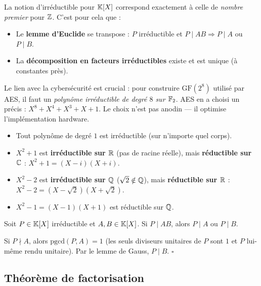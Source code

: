 \begin{intuitionbox}
La notion d'irréductible pour $\mathbb{K}[X]$ correspond exactement à celle de \emph{nombre premier} pour $\mathbb{Z}$. C'est pour cela que :
\begin{itemize}[leftmargin=1cm]
  \item Le \textbf{lemme d'Euclide} se transpose : $P$ irréductible et $P \mid AB \Rightarrow P \mid A$ ou $P \mid B$.
  \item La \textbf{décomposition en facteurs irréductibles} existe et est unique (à constantes près).
\end{itemize}
Le lien avec la cybersécurité est crucial : pour construire $\mathrm{GF}(2^8)$ utilisé par AES, il faut un \emph{polynôme irréductible de degré $8$ sur $\mathbb{F}_2$}. AES en a choisi un précis : $X^8 + X^4 + X^3 + X + 1$. Le choix n'est pas anodin --- il optimise l'implémentation hardware.
\end{intuitionbox}

\begin{exbox}
\begin{itemize}[leftmargin=1cm]
  \item Tout polynôme de degré $1$ est irréductible (sur n'importe quel corps).
  \item $X^2 + 1$ est \textbf{irréductible sur $\mathbb{R}$} (pas de racine réelle), mais \textbf{réductible sur $\mathbb{C}$} : $X^2 + 1 = (X - i)(X + i)$.
  \item $X^2 - 2$ est \textbf{irréductible sur $\mathbb{Q}$} ($\sqrt{2} \notin \mathbb{Q}$), mais \textbf{réductible sur $\mathbb{R}$} : $X^2 - 2 = (X - \sqrt{2})(X + \sqrt{2})$.
  \item $X^2 - 1 = (X - 1)(X + 1)$ est réductible sur $\mathbb{Q}$.
\end{itemize}
\end{exbox}

\begin{propbox}
Soit $P \in \mathbb{K}[X]$ irréductible et $A, B \in \mathbb{K}[X]$. Si $P \mid AB$, alors $P \mid A$ ou $P \mid B$.
\end{propbox}

\begin{proofbox}
Si $P \nmid A$, alors $\text{pgcd}(P, A) = 1$ (les seuls diviseurs unitaires de $P$ sont $1$ et $P$ lui-même rendu unitaire). Par le lemme de Gauss, $P \mid B$. \hfill$\square$
\end{proofbox}

\subsection{Théorème de factorisation}

